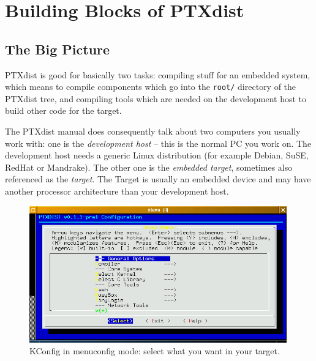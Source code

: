 \chapter{Building Blocks of PTXdist} 		\label{chap:building-blocks}

\section*{The Big Picture}

PTXdist is good for basically two tasks: compiling stuff for an embedded
system, which means to compile components which go into the
\texttt{root/} directory of the PTXdist tree, and compiling tools which
are needed on the development host to build other code for the target. 

\begin{important}
The PTXdist manual does consequently talk about two computers you
usually work with: one is the \emph{development host} -- this is the
normal PC you work on. The development host needs a generic Linux
distribution (for example Debian, SuSE, RedHat or Mandrake).  The other
one is the \emph{embedded target}, sometimes also referenced as the
\emph{target}. The Target is usually an embedded device and may have
another processor architecture than your development host.
\end{important}

\begin{figure}[b]
	\centerline{\includegraphics[width=0.99\textwidth]{figures/menuconfig}}
	\caption{
		KConfig in menuconfig mode: select what you want in your
		target. 	
		\label{fig:menuconfig}
	}
\end{figure}

